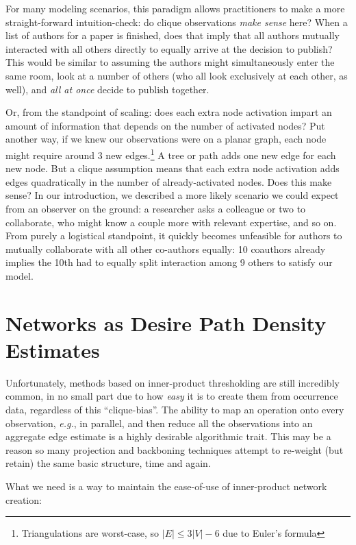 \documentclass[%
	12pt,
		oneside,
		letterpaper
]{book}
\begin{document}
For many modeling scenarios, this paradigm allows practitioners to make
a more straight-forward intuition-check: do clique observations
\emph{make sense} here? When a list of authors for a paper is finished,
does that imply that all authors mutually interacted with all others
directly to equally arrive at the decision to publish? This would be
similar to assuming the authors might simultaneously enter the same
room, look at a number of others (who all look exclusively at each
other, as well), and \emph{all at once} decide to publish together.

Or, from the standpoint of scaling: does each extra node activation
impart an amount of information that depends on the number of activated
nodes? Put another way, if we knew our observations were on a planar
graph, each node might require around 3 new edges.\footnote{Triangulations
  are worst-case, so \(|E|\leq 3|V|-6\) due to Euler's formula} A tree
or path adds one new edge for each new node. But a clique assumption
means that each extra node activation adds edges quadratically in the
number of already-activated nodes. Does this make sense? In our
introduction, we described a more likely scenario we could expect from
an observer on the ground: a researcher asks a colleague or two to
collaborate, who might know a couple more with relevant expertise, and
so on. From purely a logistical standpoint, it quickly becomes
unfeasible for authors to mutually collaborate with all other co-authors
equally: 10 coauthors already implies the 10th had to equally split
interaction among 9 others to satisfy our model.

\section{Networks as Desire Path Density
Estimates}\label{networks-as-desire-path-density-estimates}

Unfortunately, methods based on inner-product thresholding are still
incredibly common, in no small part due to how \emph{easy} it is to
create them from occurrence data, regardless of this ``clique-bias''.
The ability to map an operation onto every observation, \emph{e.g.}, in
parallel, and then reduce all the observations into an aggregate edge
estimate is a highly desirable algorithmic trait. This may be a reason
so many projection and backboning techniques attempt to re-weight (but
retain) the same basic structure, time and again.

What we need is a way to maintain the ease-of-use of inner-product
network creation:
\end{document}
